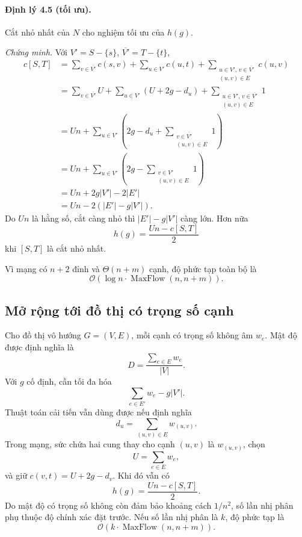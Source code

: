 \documentclass[11pt]{article}
\newcommand{\Oh}{\mathcal{O}}
\begin{document}
\paragraph{Định lý 4.5 (tối ưu).}
Cắt nhỏ nhất của \(N\) cho nghiệm tối ưu của \(h(g)\).

\emph{Chứng minh.}
Với \(V'=S-\{s\}\), \(\overline{V'}=T-\{t\}\),
\[
\begin{aligned}
c[S,T]
&=\sum_{v\in\overline{V'}} c(s,v)
  +\sum_{u\in V'} c(u,t)
  +\sum_{\substack{u\in V',\,v\in\overline{V'}\\(u,v)\in E}} c(u,v)\\
&=\sum_{v\in\overline{V'}} U
  +\sum_{u\in V'}(U+2g-d_u)
  +\sum_{\substack{u\in V',\,v\in\overline{V'}\\(u,v)\in E}}1\\
&=Un+\sum_{u\in V'}
  \left(2g-d_u+\sum_{\substack{v\in\overline{V'}\\(u,v)\in E}}1\right)\\
&=Un+\sum_{u\in V'}
  \left(2g-\sum_{\substack{v\in V'\\(u,v)\in E}}1\right)\\
&=Un+2g|V'|-2|E'|\\
&=Un-2(|E'|-g|V'|).
\end{aligned}
\]
Do \(Un\) là hằng số, cắt càng nhỏ thì \(|E'|-g|V'|\) càng lớn. Hơn nữa
\[
  h(g)=\frac{Un-c[S,T]}2
\]
khi \([S,T]\) là cắt nhỏ nhất.

Vì mạng có \(n+2\) đỉnh và \(\Theta(n+m)\) cạnh, độ phức tạp toàn bộ là
\[
  \Oh(\log n\cdot \operatorname{MaxFlow}(n,n+m)).
\]

\subsection{Mở rộng tới đồ thị có trọng số cạnh}

Cho đồ thị vô hướng \(G=(V,E)\), mỗi cạnh có trọng số không âm \(w_e\). Mật độ
được định nghĩa là
\[
  D=\frac{\sum_{e\in E}w_e}{|V|}.
\]
Với \(g\) cố định, cần tối đa hóa
\[
  \sum_{e\in E'}w_e-g|V'|. \tag{4.2}
\]
Thuật toán cải tiến vẫn dùng được nếu định nghĩa
\[
  d_u=\sum_{(u,v)\in E} w_{(u,v)}.
\]
Trong mạng, sức chứa hai cung thay cho cạnh \((u,v)\) là \(w_{(u,v)}\), chọn
\[
  U=\sum_{e\in E} w_e,
\]
và giữ \(c(v,t)=U+2g-d_v\). Khi đó vẫn có
\[
  h(g)=\frac{Un-c[S,T]}2.
\]
Do mật độ có trọng số không còn đảm bảo khoảng cách \(1/n^2\), số lần nhị
phân phụ thuộc độ chính xác đặt trước. Nếu số lần nhị phân là \(k\), độ phức
tạp là
\[
  \Oh(k\cdot \operatorname{MaxFlow}(n,n+m)).
\]
\end{document}
